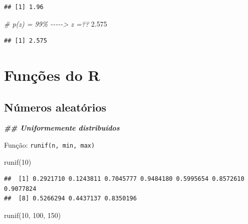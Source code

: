 \documentclass[
]{article}
\newenvironment{Shaded}{\begin{snugshade}}{\end{snugshade}}
\newcommand{\CommentTok}[1]{\textcolor[rgb]{0.56,0.35,0.01}{\textit{#1}}}
\newcommand{\DecValTok}[1]{\textcolor[rgb]{0.00,0.00,0.81}{#1}}
\newcommand{\DocumentationTok}[1]{\textcolor[rgb]{0.56,0.35,0.01}{\textbf{\textit{#1}}}}
\newcommand{\FloatTok}[1]{\textcolor[rgb]{0.00,0.00,0.81}{#1}}
\newcommand{\FunctionTok}[1]{\textcolor[rgb]{0.00,0.00,0.00}{#1}}
\newcommand{\NormalTok}[1]{#1}
\begin{document}
\begin{verbatim}
## [1] 1.96
\end{verbatim}

\begin{Shaded}
\begin{Highlighting}[]
\CommentTok{\# p(z) = 99\% {-}{-}{-}{-}{-}\textgreater{} z =??}
\FloatTok{2.575}
\end{Highlighting}
\end{Shaded}

\begin{verbatim}
## [1] 2.575
\end{verbatim}

\hypertarget{funuxe7uxf5es-do-r}{%
\section{Funções do R}\label{funuxe7uxf5es-do-r}}

\hypertarget{nuxfameros-aleatuxf3rios}{%
\subsection{Números aleatórios}\label{nuxfameros-aleatuxf3rios}}

\begin{Shaded}
\begin{Highlighting}[]
\DocumentationTok{\#\# Uniformemente distribuídos}
\end{Highlighting}
\end{Shaded}

Função: \texttt{runif(n,\ min,\ max)}

\begin{Shaded}
\begin{Highlighting}[]
\FunctionTok{runif}\NormalTok{(}\DecValTok{10}\NormalTok{)}
\end{Highlighting}
\end{Shaded}

\begin{verbatim}
##  [1] 0.2921710 0.1243811 0.7045777 0.9484180 0.5995654 0.8572610 0.9077824
##  [8] 0.5266294 0.4437137 0.8350196
\end{verbatim}

\begin{Shaded}
\begin{Highlighting}[]
\FunctionTok{runif}\NormalTok{(}\DecValTok{10}\NormalTok{, }\DecValTok{100}\NormalTok{, }\DecValTok{150}\NormalTok{)}
\end{Highlighting}
\end{Shaded}
\end{document}
